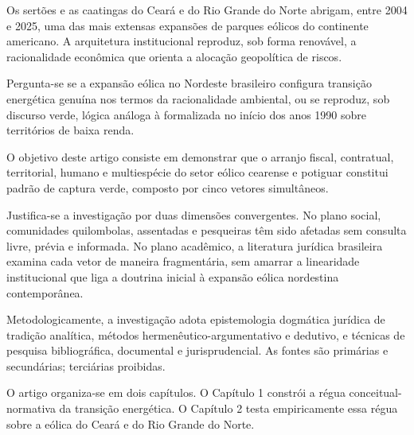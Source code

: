 
Os sertões e as caatingas do Ceará e do Rio Grande do Norte abrigam, entre 2004 e 2025, uma das mais extensas expansões de parques eólicos do continente americano. A arquitetura institucional reproduz, sob forma renovável, a racionalidade econômica que orienta a alocação geopolítica de riscos.

Pergunta-se se a expansão eólica no Nordeste brasileiro configura transição energética genuína nos termos da racionalidade ambiental, ou se reproduz, sob discurso verde, lógica análoga à formalizada no início dos anos 1990 sobre territórios de baixa renda.

O objetivo deste artigo consiste em demonstrar que o arranjo fiscal, contratual, territorial, humano e multiespécie do setor eólico cearense e potiguar constitui padrão de captura verde, composto por cinco vetores simultâneos.

Justifica-se a investigação por duas dimensões convergentes. No plano social, comunidades quilombolas, assentadas e pesqueiras têm sido afetadas sem consulta livre, prévia e informada. No plano acadêmico, a literatura jurídica brasileira examina cada vetor de maneira fragmentária, sem amarrar a linearidade institucional que liga a doutrina inicial à expansão eólica nordestina contemporânea.

Metodologicamente, a investigação adota epistemologia dogmática jurídica de tradição analítica, métodos hermenêutico-argumentativo e dedutivo, e técnicas de pesquisa bibliográfica, documental e jurisprudencial. As fontes são primárias e secundárias; terciárias proibidas.

O artigo organiza-se em dois capítulos. O Capítulo 1 constrói a régua conceitual-normativa da transição energética. O Capítulo 2 testa empiricamente essa régua sobre a eólica do Ceará e do Rio Grande do Norte.
